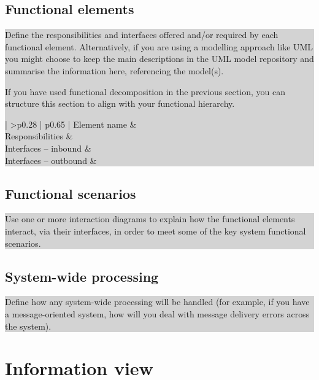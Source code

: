 \documentclass[a4paper,11pt]{report}
\newcommand{\instructions}[1]{
  \noindent\colorbox{lightgray}{%
    \parbox{\linewidth}{%
      #1
    }%
  }%
 \vspace{0.1cm}
}
\begin{document}
\subsection{Functional elements}
\label{sec:functional-elements}

\instructions{
Define the responsibilities and interfaces offered and/or required by
each functional element. Alternatively, if you are using a modelling
approach like UML you might choose to keep the main descriptions in
the UML model repository and summarise the information here,
referencing the model(s).

If you have used functional decomposition in the previous section, you
can structure this section to align with your functional hierarchy.

\begin{center}
  \begin{tabular}[h!]{| >{\columncolor{gray}}p{0.28\textwidth} | p{0.65\textwidth} |}
    \hline
    Element name & \\
    \hline
    Responsibilities & \\
    \hline
    Interfaces -- inbound & \\
    \hline
    Interfaces -- outbound & \\
   \hline
  \end{tabular}
\end{center}
}

\subsection{Functional scenarios}
\label{sec:functional-scenarios-1}

\instructions{
Use one or more interaction diagrams to explain how the functional
elements interact, via their interfaces, in order to meet some of the
key system functional scenarios.
}

\subsection{System-wide processing}
\label{sec:syst-wide-proc}

\instructions{
Define how any system-wide processing will be handled (for example, if
you have a message-oriented system, how will you deal with message
delivery errors across the system).
}

\section{Information view}
\label{cha:information-view}
\end{document}
